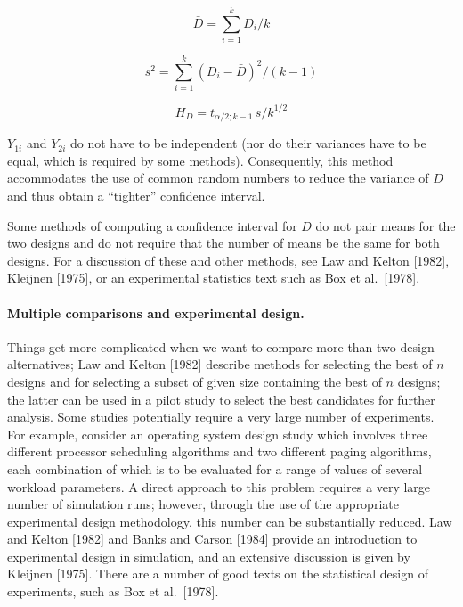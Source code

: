 \begin{equation}
\bar{D} = \sum_{i=1}^{k} D_i / k
\label{eq:output-mean-d}
\end{equation}

\begin{equation}
s^2 = \sum_{i=1}^{k} (D_i - \bar{D})^2 / (k - 1)
\label{eq:output-var-d}
\end{equation}

\begin{equation}
H_D = t_{\alpha/2;k-1} \, s / k^{1/2}
\label{eq:output-ci-d}
\end{equation}

$Y_{1i}$ and $Y_{2i}$ do not have to be independent (nor do their variances have
to be equal, which is required by some methods). Consequently, this method
accommodates the use of common random numbers to reduce the variance of $D$ and
thus obtain a ``tighter'' confidence interval.

Some methods of computing a confidence interval for $D$ do not pair means for
the two designs and do not require that the number of means be the same for
both designs. For a discussion of these and other methods, see Law and Kelton
[1982], Kleijnen [1975], or an experimental statistics text such as Box et al.\
[1978].

\paragraph{Multiple comparisons and experimental design.}
Things get more complicated when we want to compare more than two design
alternatives; Law and Kelton [1982] describe methods for selecting the best of
$n$ designs and for selecting a subset of given size containing the best of $n$
designs; the latter can be used in a pilot study to select the best candidates
for further analysis. Some studies potentially require a very large number of
experiments. For example, consider an operating system design study which
involves three different processor scheduling algorithms and two different
paging algorithms, each combination of which is to be evaluated for a range of
values of several workload parameters. A direct approach to this problem
requires a very large number of simulation runs; however, through the use of
the appropriate experimental design methodology, this number can be
substantially reduced. Law and Kelton [1982] and Banks and Carson [1984]
provide an introduction to experimental design in simulation, and an extensive
discussion is given by Kleijnen [1975]. There are a number of good texts on the
statistical design of experiments, such as Box et al.\ [1978].

